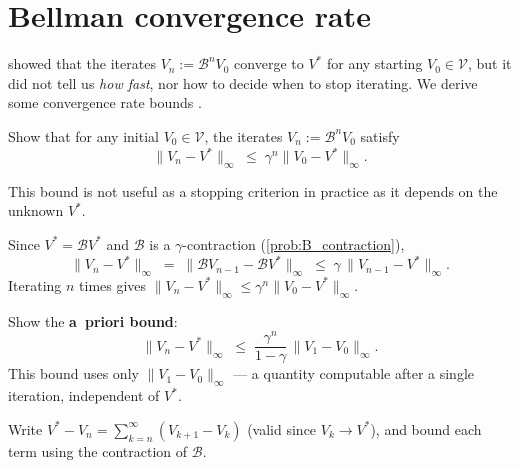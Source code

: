 \documentclass[11pt]{article}
\begin{document}


\section{Bellman convergence rate}\label{prob:convergence_rate}

 showed that the iterates $V_n := \mathcal{B}^n V_0$ converge to $V^*$ for any starting $V_0 \in \mathcal{V}$, but it did not tell us \emph{how fast}, nor how to decide when to stop iterating. We derive some convergence rate bounds \cite[Chapter~6]{putermanMarkovDecisionProcesses1994}.

\begin{exercise}
\label{prob:geometric_decay} Show that for any initial $V_0 \in \mathcal{V}$, the iterates $V_n := \mathcal{B}^n V_0$ satisfy
$$
\|V_n - V^*\|_\infty \;\le\; \gamma^n \|V_0 - V^*\|_\infty.
$$
\begin{remark}
This bound is not useful as a stopping criterion in practice as it depends on the unknown $V^*$.
\end{remark}
\end{exercise}

\begin{solution}
Since $V^* = \mathcal{B} V^*$ and $\mathcal{B}$ is a $\gamma$-contraction (\cref{prob:B_contraction}),
$$
\|V_n - V^*\|_\infty \;=\; \|\mathcal{B} V_{n-1} - \mathcal{B} V^*\|_\infty \;\le\; \gamma\, \|V_{n-1} - V^*\|_\infty.
$$
Iterating $n$ times gives $\|V_n - V^*\|_\infty \le \gamma^n \|V_0 - V^*\|_\infty$.
\end{solution}

\begin{exercise}
\label{prob:a_priori_bound} Show the \textbf{a~priori bound}:
$$
\|V_n - V^*\|_\infty \;\le\; \frac{\gamma^n}{1-\gamma}\, \|V_1 - V_0\|_\infty.
$$
This bound uses only $\|V_1 - V_0\|_\infty$ --- a quantity computable after a single iteration, independent of $V^*$.

\begin{hint}
Write $V^* - V_n = \sum_{k=n}^{\infty}(V_{k+1} - V_k)$ (valid since $V_k \to V^*$), and bound each term using the contraction of $\mathcal{B}$.
\end{hint}
\end{exercise}
\end{document}
